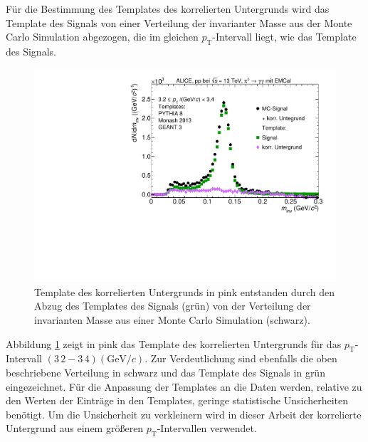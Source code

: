 Für die Bestimmung des Templates des korrelierten Untergrunds wird das Template des Signals von einer Verteilung der invarianter Masse aus der Monte Carlo Simulation abgezogen, die im gleichen $p_\text{T}$-Intervall liegt, wie das Template des Signals.
\begin{figure}[tp]
\centering
\includegraphics[width=.75\linewidth]{EntstehungUntergrund10_Data_2016.pdf}
\caption{Template des korrelierten Untergrunds in pink entstanden durch den Abzug des Templates des Signals (grün) von der Verteilung der invarianten Masse aus einer Monte Carlo Simulation (schwarz).}
\label{fig:BkgTemp}
\end{figure}
\newline
Abbildung \ref{fig:BkgTemp} zeigt in pink das Template des korrelierten Untergrunds für das $p_\text{T}$-Intervall $(3\,2 - 3\,4) (\text{GeV/}c)$.
Zur Verdeutlichung sind ebenfalls die oben beschriebene Verteilung in schwarz und das Template des Signals in grün eingezeichnet.
\newline
Für die Anpassung der Templates an die Daten werden, relative zu den Werten der Einträge in den Templates, geringe statistische Unsicherheiten benötigt.
Um die Unsicherheit zu verkleinern wird in dieser Arbeit der korrelierte Untergrund aus einem größeren $p_\text{T}$-Intervallen verwendet.
